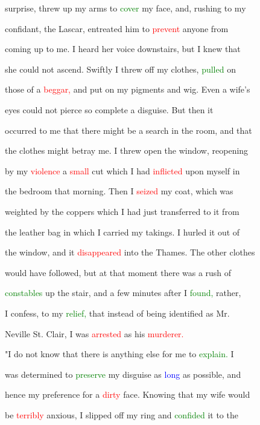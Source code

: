  \textcolor{BurntOrange}{surprise,} threw up my arms to \textcolor{green}{cover} my face, and, rushing to my

 confidant, the Lascar, entreated him to \textcolor{red}{prevent} anyone from

 coming up to me. I heard her voice downstairs, but I knew that

 she could not ascend. Swiftly I threw off my clothes, \textcolor{green}{pulled} on

 those of a \textcolor{red}{beggar,} and put on my pigments and wig. Even a wife's

 eyes could not pierce so complete a disguise. But then it

 occurred to me that there might be a search in the room, and that

 the clothes might \textcolor{BurntOrange}{betray} me. I threw open the window, reopening

 by my \textcolor{red}{violence} a \textcolor{red}{small} cut which I had \textcolor{red}{inflicted} upon myself in

 the bedroom that morning. Then I \textcolor{red}{seized} my coat, which was

 \textcolor{BurntOrange}{weighted} by the coppers which I had just transferred to it from

 the leather bag in which I carried my takings. I hurled it out of

 the window, and it \textcolor{red}{disappeared} into the Thames. The other clothes

 would have followed, but at that moment there was a rush of

 \textcolor{green}{constables} up the stair, and a few minutes after I \textcolor{green}{found,} rather,

 I \textcolor{BurntOrange}{confess,} to my \textcolor{green}{relief,} that instead of being identified as Mr.

 Neville St. Clair, I was \textcolor{red}{arrested} as his \textcolor{red}{murderer.}



 "I do not know that there is anything else for me to \textcolor{green}{explain.} I

 was determined to \textcolor{green}{preserve} my disguise as \textcolor{blue}{long} as possible, and

 hence my preference for a \textcolor{red}{dirty} face. Knowing that my wife would

 be \textcolor{red}{terribly} \textcolor{BurntOrange}{anxious,} I \textcolor{BurntOrange}{slipped} off my ring and \textcolor{green}{confided} it to the

